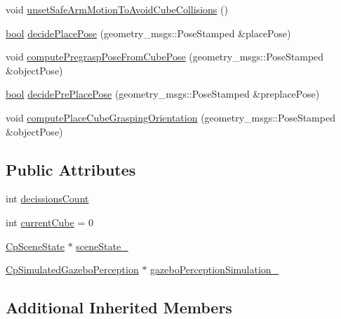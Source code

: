 \begin{DoxyCompactItemize}
void \hyperlink{classsm__moveit__4_1_1cl__perception__system_1_1ClPerceptionSystem_ab8bbe4be37d763fde0e67e9edd33b83a}{unset\+Safe\+Arm\+Motion\+To\+Avoid\+Cube\+Collisions} ()
\item 
\hyperlink{classbool}{bool} \hyperlink{classsm__moveit__4_1_1cl__perception__system_1_1ClPerceptionSystem_af6ff9a225d451bdee312573296ed02a8}{decide\+Place\+Pose} (geometry\+\_\+msgs\+::\+Pose\+Stamped \&place\+Pose)
\item 
void \hyperlink{classsm__moveit__4_1_1cl__perception__system_1_1ClPerceptionSystem_a57222e7497e1296974c0c16b55810cef}{compute\+Pregrasp\+Pose\+From\+Cube\+Pose} (geometry\+\_\+msgs\+::\+Pose\+Stamped \&object\+Pose)
\item 
\hyperlink{classbool}{bool} \hyperlink{classsm__moveit__4_1_1cl__perception__system_1_1ClPerceptionSystem_a027d06bc7cba5ace251a65bb29777c26}{decide\+Pre\+Place\+Pose} (geometry\+\_\+msgs\+::\+Pose\+Stamped \&preplace\+Pose)
\item 
void \hyperlink{classsm__moveit__4_1_1cl__perception__system_1_1ClPerceptionSystem_afda35b6252c0a5c0692e3ff956609c23}{compute\+Place\+Cube\+Grasping\+Orientation} (geometry\+\_\+msgs\+::\+Pose\+Stamped \&object\+Pose)
\end{DoxyCompactItemize}
\subsection*{Public Attributes}
\begin{DoxyCompactItemize}
\item 
int \hyperlink{classsm__moveit__4_1_1cl__perception__system_1_1ClPerceptionSystem_ac41f768142251a6a4330c6ca1050b2fe}{decissions\+Count}
\item 
int \hyperlink{classsm__moveit__4_1_1cl__perception__system_1_1ClPerceptionSystem_ae2a80b803814af8b3c87f810f2728af0}{current\+Cube} = 0
\item 
\hyperlink{classsm__moveit__4_1_1cl__perception__system_1_1CpSceneState}{Cp\+Scene\+State} $\ast$ \hyperlink{classsm__moveit__4_1_1cl__perception__system_1_1ClPerceptionSystem_a82ea8feeb2fa43349f91ed59137b3890}{scene\+State\+\_\+}
\item 
\hyperlink{classsm__moveit__4_1_1cl__perception__system_1_1CpSimulatedGazeboPerception}{Cp\+Simulated\+Gazebo\+Perception} $\ast$ \hyperlink{classsm__moveit__4_1_1cl__perception__system_1_1ClPerceptionSystem_a027c07df3f1a2cc0c30be111b27dbe5c}{gazebo\+Perception\+Simulation\+\_\+}
\end{DoxyCompactItemize}
\subsection*{Additional Inherited Members}


